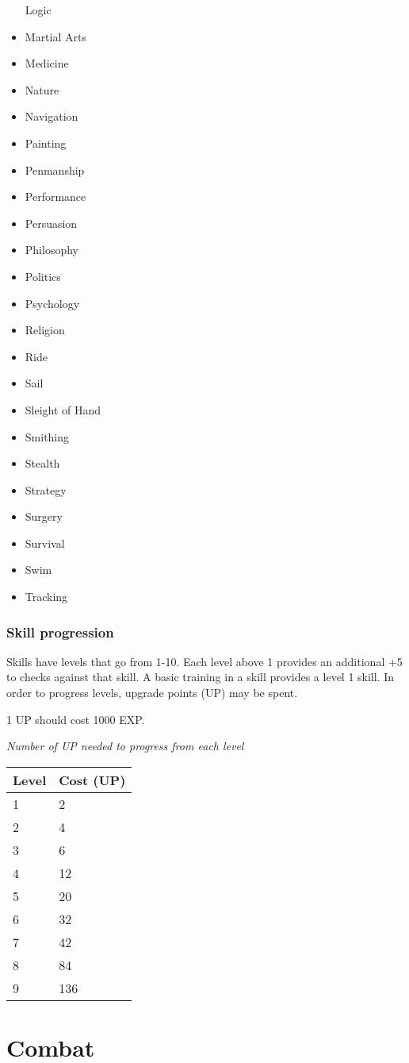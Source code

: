 \documentclass[12pt,]{article}
\begin{document}
\begin{itemize}
  Logic
\item
  Martial Arts
\item
  Medicine
\item
  Nature
\item
  Navigation
\item
  Painting
\item
  Penmanship
\item
  Performance
\item
  Persuasion
\item
  Philosophy
\item
  Politics
\item
  Psychology
\item
  Religion
\item
  Ride
\item
  Sail
\item
  Sleight of Hand
\item
  Smithing
\item
  Stealth
\item
  Strategy
\item
  Surgery
\item
  Survival
\item
  Swim
\item
  Tracking
\end{itemize}

\subsubsection{Skill progression}\label{skill-progression}

Skills have levels that go from 1-10. Each level above 1 provides an
additional +5 to checks against that skill. A basic training in a skill
provides a level 1 skill. In order to progress levels, upgrade points
(UP) may be spent.

1 UP should cost 1000 EXP.

\emph{Number of UP needed to progress from each level}

\begin{longtable}[]{@{}ll@{}}
\toprule
Level & Cost (UP)\tabularnewline
\midrule
\endhead
1 & 2\tabularnewline
2 & 4\tabularnewline
3 & 6\tabularnewline
4 & 12\tabularnewline
5 & 20\tabularnewline
6 & 32\tabularnewline
7 & 42\tabularnewline
8 & 84\tabularnewline
9 & 136\tabularnewline
\bottomrule
\end{longtable}

\section{Combat}\label{combat}
\end{document}
